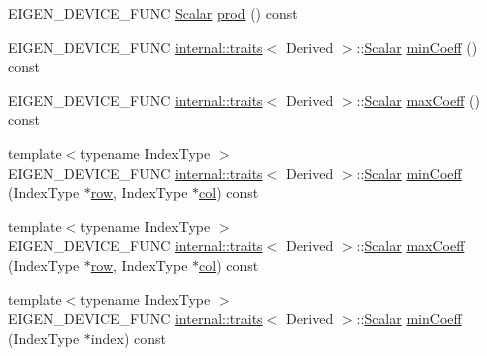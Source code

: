 \begin{DoxyCompactItemize}
\item 
E\+I\+G\+E\+N\+\_\+\+D\+E\+V\+I\+C\+E\+\_\+\+F\+U\+NC \mbox{\hyperlink{class_eigen_1_1_dense_base_a5feed465b3a8e60c47e73ecce83e39a2}{Scalar}} \mbox{\hyperlink{class_eigen_1_1_dense_base_a175ceb201923b4c6767770559e47e40e}{prod}} () const
\item 
E\+I\+G\+E\+N\+\_\+\+D\+E\+V\+I\+C\+E\+\_\+\+F\+U\+NC \mbox{\hyperlink{struct_eigen_1_1internal_1_1traits}{internal\+::traits}}$<$ Derived $>$\+::\mbox{\hyperlink{class_eigen_1_1_dense_base_a5feed465b3a8e60c47e73ecce83e39a2}{Scalar}} \mbox{\hyperlink{class_eigen_1_1_dense_base_a6634944be3d4fef551b57ffad30467f2}{min\+Coeff}} () const
\item 
E\+I\+G\+E\+N\+\_\+\+D\+E\+V\+I\+C\+E\+\_\+\+F\+U\+NC \mbox{\hyperlink{struct_eigen_1_1internal_1_1traits}{internal\+::traits}}$<$ Derived $>$\+::\mbox{\hyperlink{class_eigen_1_1_dense_base_a5feed465b3a8e60c47e73ecce83e39a2}{Scalar}} \mbox{\hyperlink{class_eigen_1_1_dense_base_ac0d151ec47eb7a44a3a5ba1587ddbeb4}{max\+Coeff}} () const
\item 
{\footnotesize template$<$typename Index\+Type $>$ }\\E\+I\+G\+E\+N\+\_\+\+D\+E\+V\+I\+C\+E\+\_\+\+F\+U\+NC \mbox{\hyperlink{struct_eigen_1_1internal_1_1traits}{internal\+::traits}}$<$ Derived $>$\+::\mbox{\hyperlink{class_eigen_1_1_dense_base_a5feed465b3a8e60c47e73ecce83e39a2}{Scalar}} \mbox{\hyperlink{class_eigen_1_1_dense_base_a05044a037125e705d87bd28f678b914c}{min\+Coeff}} (Index\+Type $\ast$\mbox{\hyperlink{class_eigen_1_1_dense_base_a4ea11afe36c7962c706caa93decd1380}{row}}, Index\+Type $\ast$\mbox{\hyperlink{class_eigen_1_1_dense_base_a469583ed90462820888344e63ebe1a80}{col}}) const
\item 
{\footnotesize template$<$typename Index\+Type $>$ }\\E\+I\+G\+E\+N\+\_\+\+D\+E\+V\+I\+C\+E\+\_\+\+F\+U\+NC \mbox{\hyperlink{struct_eigen_1_1internal_1_1traits}{internal\+::traits}}$<$ Derived $>$\+::\mbox{\hyperlink{class_eigen_1_1_dense_base_a5feed465b3a8e60c47e73ecce83e39a2}{Scalar}} \mbox{\hyperlink{class_eigen_1_1_dense_base_ab8318ab23b3d421b809fef0cb24f69e3}{max\+Coeff}} (Index\+Type $\ast$\mbox{\hyperlink{class_eigen_1_1_dense_base_a4ea11afe36c7962c706caa93decd1380}{row}}, Index\+Type $\ast$\mbox{\hyperlink{class_eigen_1_1_dense_base_a469583ed90462820888344e63ebe1a80}{col}}) const
\item 
{\footnotesize template$<$typename Index\+Type $>$ }\\E\+I\+G\+E\+N\+\_\+\+D\+E\+V\+I\+C\+E\+\_\+\+F\+U\+NC \mbox{\hyperlink{struct_eigen_1_1internal_1_1traits}{internal\+::traits}}$<$ Derived $>$\+::\mbox{\hyperlink{class_eigen_1_1_dense_base_a5feed465b3a8e60c47e73ecce83e39a2}{Scalar}} \mbox{\hyperlink{class_eigen_1_1_dense_base_a7d6ebd550eaaee24fed7880c39ae3f35}{min\+Coeff}} (Index\+Type $\ast$index) const

\end{DoxyCompactItemize}
